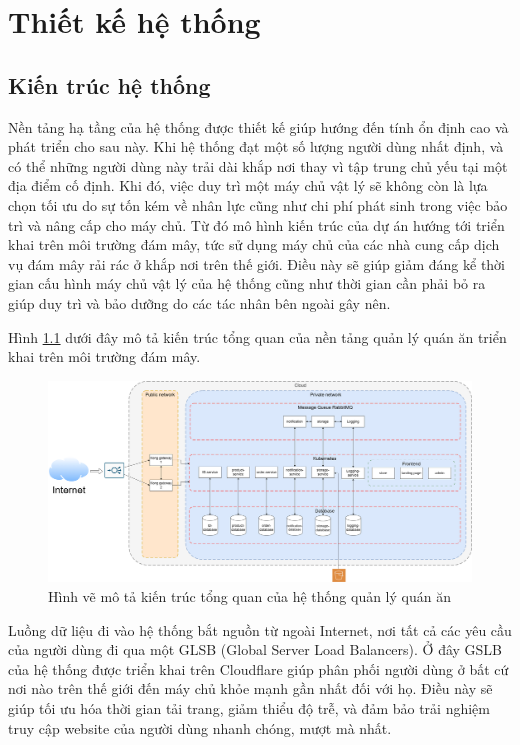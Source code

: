 \chapter{Thiết kế hệ thống}\label{chap2}
\section{Kiến trúc hệ thống}
Nền tảng hạ tầng của hệ thống được thiết kế giúp hướng đến tính ổn định cao và phát triển cho sau này.
Khi hệ thống đạt một số lượng người dùng nhất định, và có thể những người dùng này trải dài khắp nơi thay vì tập trung chủ yếu tại một địa điểm cố định.
Khi đó, việc duy trì một máy chủ vật lý sẽ không còn là lựa chọn tối ưu do sự tốn kém về nhân lực cũng như chi phí phát sinh trong việc bảo trì và nâng cấp cho máy chủ.
Từ đó mô hình kiến trúc của dự án hướng tới triển khai trên môi trường đám mây, tức sử dụng máy chủ của các nhà cung cấp dịch vụ đám mây rải rác ở khắp nơi trên thế giới.
Điều này sẽ giúp giảm đáng kể thời gian cấu hình máy chủ vật lý của hệ thống cũng như thời gian cần phải bỏ ra giúp duy trì và bảo dưỡng do các tác nhân bên ngoài gây nên.

Hình \ref{fig:overall-architecture} dưới đây mô tả kiến trúc tổng quan của nền tảng quản lý quán ăn triển khai trên môi trường đám mây.

\begin{figure}[h]
	\centering
	\includegraphics[width=1.1\textwidth]{images/hChip/overall-architecture.png}
	\caption{Hình vẽ mô tả kiến trúc tổng quan của hệ thống quản lý quán ăn}
	\label{fig:overall-architecture}
\end{figure}

Luồng dữ liệu đi vào hệ thống bắt nguồn từ ngoài Internet, nơi tất cả các yêu cầu của người dùng đi qua một GLSB (Global Server Load Balancers).
Ở đây GSLB của hệ thống được triển khai trên Cloudflare giúp phân phối người dùng ở bất cứ nơi nào trên thế giới đến máy chủ khỏe mạnh gần nhất đối với họ.
Điều này sẽ giúp tối ưu hóa thời gian tải trang, giảm thiểu độ trễ, và đảm bảo trải nghiệm truy cập website của người dùng nhanh chóng, mượt mà nhất.

